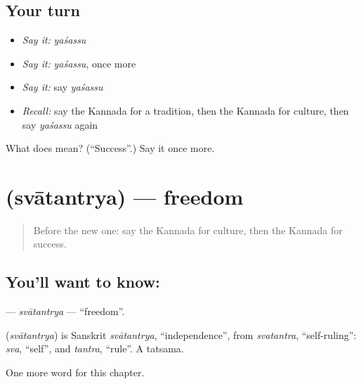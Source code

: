 \subsection*{Your turn}
\begin{itemize}
\raggedright
  \item \emph{Say it:} \emph{yaśassu}
  \item \emph{Say it:} \emph{yaśassu}, once more
  \item \emph{Say it:} say \emph{yaśassu}
  \item \emph{Recall:} say the Kannada for a tradition, then the Kannada for culture, then say \emph{yaśassu} again
\end{itemize}

\begin{tcolorbox}[breakable,colback=teal!4,colframe=teal!35!black,title={Before you move on}]
What does  mean? (\textquotedblleft{}Success\textquotedblright{}.) Say it once more.
\end{tcolorbox}
\section[\texorpdfstring{\kn{ಸ್ವಾತಂತ್ರ್ಯ} (svātantrya)}{ಸ್ವಾತಂತ್ರ್ಯ (svātantrya)}]{ (svātantrya) — freedom}

\label{lesson:KA-C216-svatantrya}



\begin{quote}
Before the new one: say the Kannada for culture, then the Kannada for success.
\end{quote}

\subsection*{You'll want to know: }
\textbf{} — \emph{svātantrya} — \textquotedblleft{}freedom\textquotedblright{}.

\begin{cousinweb}
\textbf{} (\emph{svātantrya}) is Sanskrit \emph{svātantrya}, \textquotedblleft{}independence\textquotedblright{}, from \emph{svatantra}, \textquotedblleft{}self-ruling\textquotedblright{}: \emph{sva}, \textquotedblleft{}self\textquotedblright{}, and \emph{tantra}, \textquotedblleft{}rule\textquotedblright{}. A tatsama.
\end{cousinweb}

\begin{grammarlens}[title={What you've built}]
One more word for this chapter.
\end{grammarlens}

